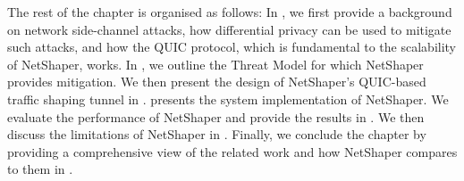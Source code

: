 The rest of the chapter is organised as follows:
In , we first provide a background on network side-channel attacks, how differential privacy can be used to mitigate such attacks, and how the QUIC protocol, which is fundamental to the scalability of NetShaper, works.
In , we outline the Threat Model for which NetShaper provides mitigation.
We then present the design of NetShaper's QUIC-based traffic shaping tunnel in .
 presents the system implementation of NetShaper.
We evaluate the performance of NetShaper and provide the results in .
We then discuss the limitations of NetShaper in .
Finally, we conclude the chapter by providing a comprehensive view of the related work and how NetShaper compares to them in .

